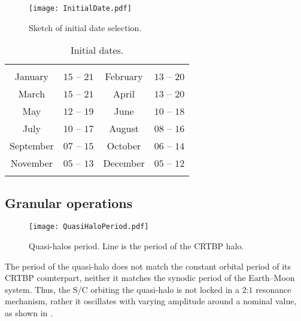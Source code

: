 %
\begin{figure}[t!]
	\centering
	\texttt{[image: InitialDate.pdf]}
	\caption{Sketch of initial date selection.}
	\label{fig:InitialDateLUMIO}
\end{figure}
%
%
\begin{table}[]
	\centering
	\footnotesize
	\caption{Initial dates.}
	\begin{tabular}{cccc}
		\TOPlines
		\multicolumn{4}{c}{Year $2023$} \\
		\MIDline
		January & $15$ -- $21$ &
		February & $13$ -- $20$ \\
		March & $15$ -- $21$ &
		April & $13$ -- $20$ \\
		May & $12$ -- $19$ &
		June & $10$ -- $18$ \\
		July & $10$ -- $17$ &
		August & $08$ -- $16$ \\
		September & $07$ -- $15$ &
		October & $06$ -- $14$ \\
		November & $05$ -- $13$ &
		December & $05$ -- $12$ \\
		\BOTTOMlines
	\end{tabular}
	\label{tab:InitialDateLUMIO}
\end{table}
%



\subsection{Granular operations}\label{subsec:granularops}
%
\begin{figure}[b!]
	\centering
	\texttt{[image: QuasiHaloPeriod.pdf]}
	\caption{Quasi-halos period. Line is the period of the CRTBP halo.}
	\label{fig:QuasiHaloPeriod}
\end{figure}
%
The period of the quasi-halo does not match the constant orbital period of its {CRTBP} counterpart, neither it matches the synodic period of the Earth--Moon system. Thus, the S/C orbiting the quasi-halo is not locked in a $2$:$1$ resonance mechanism, rather it oscillates with varying amplitude around a nominal value, as shown in .

